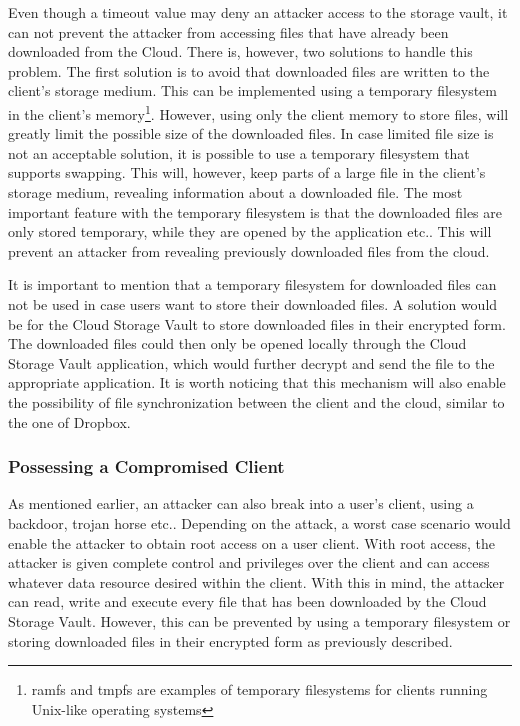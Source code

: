 \documentclass[pdftex,english,10pt,b5paper,twoside]{book}
\begin{document}
Even though a timeout value may deny an attacker access to the storage vault, it
can not prevent the attacker from accessing files that have already been downloaded from
the Cloud. There is, however, two solutions to handle this problem. The first
solution is to avoid that downloaded files are written to the client's storage
medium. This can be implemented using a temporary filesystem in the client's
memory\footnote{ramfs and tmpfs are examples of temporary filesystems for
clients running Unix-like operating systems}. However, using only the
client memory to store files, will greatly limit the possible size of the downloaded
files. In case limited file size is not an acceptable solution, it is possible to use a temporary filesystem
that supports swapping. This will, however, keep parts of a large file in the
client's storage medium, revealing information about a downloaded file. The most
important feature with the temporary filesystem is that the downloaded files are
only stored temporary, while they are opened by the application etc.. This will
prevent an attacker from revealing previously downloaded files from the cloud.

It is important to mention that a temporary filesystem for downloaded files can
not be used in case users want to store their downloaded files. A solution would
be for the Cloud Storage Vault to store downloaded files in their encrypted
form. The downloaded files could then only be opened locally through the Cloud Storage
Vault application, which would further decrypt and send the file to the
appropriate application. It is worth noticing that this mechanism will also
enable the possibility of file synchronization between the client and the cloud,
similar to the one of Dropbox.

\subsubsection{Possessing a Compromised Client}
As mentioned earlier, an attacker can also break into a user's client, using a backdoor,
trojan horse etc.. Depending on the attack, a worst case scenario would
enable the attacker to obtain root access on a user client. With root access,
the attacker is given complete control and privileges over the client and can access whatever
data resource desired within the client. With this in mind, the attacker can read,
write and execute every file that has been downloaded by the Cloud Storage
Vault. However, this can be prevented by using a temporary filesystem or
storing downloaded files in their encrypted form as previously described.
\end{document}
